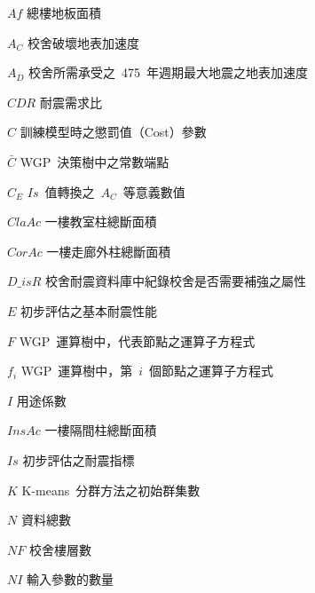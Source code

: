 %
\begin{SymEntry}

\item[$Af$]
總樓地板面積

\item[$A_C$]
校舍破壞地表加速度

\item[$A_D$]
校舍所需承受之~475~年週期最大地震之地表加速度

\item[$CDR$]
耐震需求比

\item[$C$]
訓練模型時之懲罰值（Cost）參數

\item[$\bar{C}$]
WGP~決策樹中之常數端點

\item[$C_E$]
$Is$~值轉換之~$A_C$~等意義數值

\item[$ClaAc$]
一樓教室柱總斷面積

\item[$CorAc$]
一樓走廊外柱總斷面積

\item[$D\_isR$]
校舍耐震資料庫中紀錄校舍是否需要補強之屬性

\item[$E$]
初步評估之基本耐震性能

\item[$F$]
WGP~運算樹中，代表節點之運算子方程式

\item[$f_i$]
WGP~運算樹中，第~$i$~個節點之運算子方程式

\item[$I$]
用途係數

\item[$InsAc$]
一樓隔間柱總斷面積

\item[$Is$]
初步評估之耐震指標

\item[$K$]
K-means~分群方法之初始群集數

\item[$N$]
資料總數

\item[$NF$]
校舍樓層數

\item[$NI$]
輸入參數的數量


\end{SymEntry}
